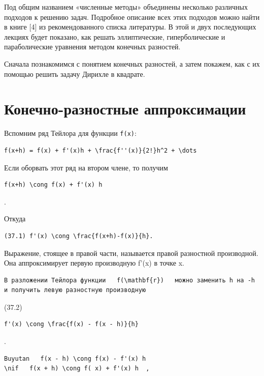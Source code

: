 \documentclass[
  ukrainian,
]{article}
\begin{document}
Под общим названием «численные методы» объединены несколько различных
подходов к решению задач. Подробное описание всех этих подходов можно
найти в книге {[}4{]} из рекомендованного списка литературы. В этой и
двух последующих лекциях будет показано, как решать эллиптические,
гиперболические и параболические уравнения методом конечных разностей.

Сначала познакомимся с понятием конечных разностей, а затем покажем, как
с их помощью решить задачу Дирихле в квадрате.

\section{Конечно-разностные
аппроксимации}\label{ux43aux43eux43dux435ux447ux43dux43e-ux440ux430ux437ux43dux43eux441ux442ux43dux44bux435-ux430ux43fux43fux440ux43eux43aux441ux438ux43cux430ux446ux438ux438}

Вспомним ряд Тейлора для функции \texttt{f(x)}:

\begin{verbatim}
f(x+h) = f(x) + f'(x)h + \frac{f''(x)}{2!}h^2 + \dots
\end{verbatim}

Если оборвать этот ряд на втором члене, то получим

\begin{verbatim}
f(x+h) \cong f(x) + f'(x) h
\end{verbatim}

.

Откуда

\begin{verbatim}
(37.1) f'(x) \cong \frac{f(x+h)-f(x)}{h}.
\end{verbatim}

Выражение, стоящее в правой части, называется правой разностной
производной. Она аппроксимирует первую производную f'(x) в точке x.

\begin{verbatim}
В разложении Тейлора функции   f(\mathbf{r})   можно заменить h на -h и получить левую разностную производную
\end{verbatim}

(37.2)

\begin{verbatim}
f'(x) \cong \frac{f(x) - f(x - h)}{h}
\end{verbatim}

.

\begin{verbatim}
Buyutan   f(x - h) \cong f(x) - f'(x) h
\nif   f(x + h) \cong f( x) + f'(x) h  ,
\end{verbatim}
\end{document}
